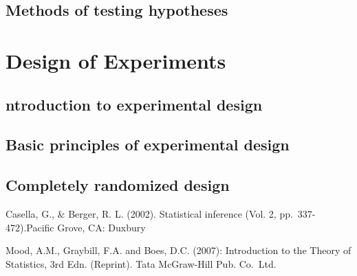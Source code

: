 \documentclass[]{book}
\begin{document}
\hypertarget{methods-of-testing-hypotheses}{%
\section{Methods of testing hypotheses}\label{methods-of-testing-hypotheses}}

\hypertarget{design-of-experiments}{%
\chapter{Design of Experiments}\label{design-of-experiments}}

\hypertarget{ntroduction-to-experimental-design}{%
\section{ntroduction to experimental design}\label{ntroduction-to-experimental-design}}

\hypertarget{basic-principles-of-experimental-design}{%
\section{Basic principles of experimental design}\label{basic-principles-of-experimental-design}}

\hypertarget{completely-randomized-design}{%
\section{Completely randomized design}\label{completely-randomized-design}}

Casella, G., \& Berger, R. L. (2002). Statistical inference (Vol. 2, pp.~337-472).Pacific Grove, CA: Duxbury

Mood, A.M., Graybill, F.A. and Boes, D.C. (2007): Introduction to the Theory of Statistics, 3rd Edn. (Reprint). Tata McGraw-Hill Pub. Co.~Ltd.


\end{document}
